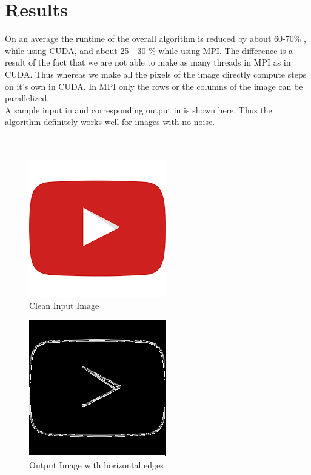 \documentclass[]{article}
\begin{document}
\section*{Results} 
\hspace{4mm} On an average the runtime of the overall algorithm is reduced by about 60-70\% , while using CUDA, and about 
25 - 30 \% while using MPI. The difference is a result of the fact that we are not able to make as many threads in
MPI as in CUDA. Thus whereas we make all the pixels of the image directly compute steps on it's own in CUDA. In MPI only 
the rows or the columns of the image can be parallelized.\\
A sample input in  and corresponding output in  is shown here. Thus the algorithm definitely works well for images with no noise. \\ \\ \\
\begin{figure}[H]
	\includegraphics[scale=0.25]{logo.png}
	\centering
	\caption{Clean Input Image} 
	\label{fig:input}
\end{figure}
\begin{figure}[H]
	\centering
	\includegraphics[scale=0.25]{image.png}
	\caption{Output Image with horizontal edges}
	\label{fig:output}
\end{figure}
\end{document}
